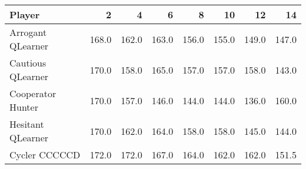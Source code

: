 \begin{tabular}{lrrrrrrr}
\toprule
            Player &      2 &      4 &      6 &      8 &     10 &     12 &     14 \\
\midrule
 Arrogant QLearner &  168.0 &  162.0 &  163.0 &  156.0 &  155.0 &  149.0 &  147.0 \\
 Cautious QLearner &  170.0 &  158.0 &  165.0 &  157.0 &  157.0 &  158.0 &  143.0 \\
 Cooperator Hunter &  170.0 &  157.0 &  146.0 &  144.0 &  144.0 &  136.0 &  160.0 \\
 Hesitant QLearner &  170.0 &  162.0 &  164.0 &  158.0 &  158.0 &  145.0 &  144.0 \\
     Cycler CCCCCD &  172.0 &  172.0 &  167.0 &  164.0 &  162.0 &  162.0 &  151.5 \\
\bottomrule
\end{tabular}
